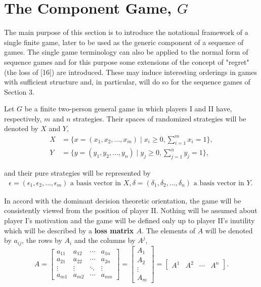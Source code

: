 \documentclass[11pt]{article}
\theoremstyle{boldStyle}
\begin{document}
\section{The Component Game, $G$}

The main purpose of this section is to introduce the notational framework of a single finite game, later to be used as the generic component of a sequence of games. The single game terminology can also be applied to the normal form of sequence games and for this purpose some extensions of the concept of "regret" (the loss of [16]) are introduced. These may induce interesting orderings in games with sufficient structure and, in particular, will do so for the sequence games of Section 3.

\medbreak

Let $G$ be a finite two-person general game in which players I and II have, respectively, $m$ and $n$ strategies. Their spaces of randomized strategies will be denoted by $X$ and $Y$,
\begin{equation} \label{eq:1}
        \begin{aligned}
            X &= \{x = (x_1, x_2, \ldots, x_m) \mid x_i \geq 0, \sum_{i=1}^m x_i = 1\}, \\
            Y &= \{y = (y_1, y_2, \ldots, y_n) \mid y_j \geq 0, \sum_{j=1}^n y_j = 1\},
        \end{aligned}
\end{equation}

and their pure strategies will be represented by
\begin{equation} \label{eq:2}
    \begin{aligned}
        \epsilon = (\epsilon_1, \epsilon_2, \ldots, \epsilon_m) \text{ a basis vector in } X,
        \delta = (\delta_1, \delta_2, \ldots, \delta_n) \text{ a basis vector in } Y.
\   \end{aligned}   
\end{equation}

In accord with the dominant decision theoretic orientation, the game will be consistently viewed from the position of player II. 
Nothing will be assumed about player I's motivation and the game will be defined only up to player II's inutility which will be described by a \textbf{loss matrix $A$}. 
The elements of $A$ will be denoted by $a_{ij}$, the rows by $A_i$ and the columns by $A^j$,
\begin{equation} \label{eq:3}
    A = \begin{bmatrix}
    a_{11} & a_{12} & \cdots & a_{1n} \\
    a_{21} & a_{22} & \cdots & a_{2n} \\
    \vdots & \vdots & \ddots & \vdots \\
    a_{m1} & a_{m2} & \cdots & a_{mn}
    \end{bmatrix} = \begin{bmatrix} A_1 \\ A_2 \\ \vdots \\ A_m \end{bmatrix} = \begin{bmatrix} A^1 & A^2 & \cdots & A^n \end{bmatrix}.
\end{equation}
\end{document}

